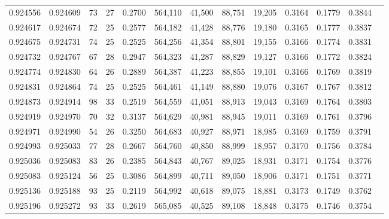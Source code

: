 \begin{tabular}{rrrrrrrrrrrrr}
0.924556 & 0.924609 &    73 &  27 &                                     0.2700 & 564,110 &  41,500 &  88,751 &  19,205 & 0.3164 & 0.1779 & 0.3844 \\
0.924617 & 0.924674 &    72 &  25 &                                     0.2577 & 564,182 &  41,428 &  88,776 &  19,180 & 0.3165 & 0.1777 & 0.3837 \\
0.924675 & 0.924731 &    74 &  25 &                                     0.2525 & 564,256 &  41,354 &  88,801 &  19,155 & 0.3166 & 0.1774 & 0.3831 \\
0.924732 & 0.924767 &    67 &  28 &                                     0.2947 & 564,323 &  41,287 &  88,829 &  19,127 & 0.3166 & 0.1772 & 0.3824 \\
0.924774 & 0.924830 &    64 &  26 &                                     0.2889 & 564,387 &  41,223 &  88,855 &  19,101 & 0.3166 & 0.1769 & 0.3819 \\
0.924831 & 0.924864 &    74 &  25 &                                     0.2525 & 564,461 &  41,149 &  88,880 &  19,076 & 0.3167 & 0.1767 & 0.3812 \\
0.924873 & 0.924914 &    98 &  33 &                                     0.2519 & 564,559 &  41,051 &  88,913 &  19,043 & 0.3169 & 0.1764 & 0.3803 \\
0.924919 & 0.924970 &    70 &  32 &                                     0.3137 & 564,629 &  40,981 &  88,945 &  19,011 & 0.3169 & 0.1761 & 0.3796 \\
0.924971 & 0.924990 &    54 &  26 &                                     0.3250 & 564,683 &  40,927 &  88,971 &  18,985 & 0.3169 & 0.1759 & 0.3791 \\
0.924993 & 0.925033 &    77 &  28 &                                     0.2667 & 564,760 &  40,850 &  88,999 &  18,957 & 0.3170 & 0.1756 & 0.3784 \\
0.925036 & 0.925083 &    83 &  26 &                                     0.2385 & 564,843 &  40,767 &  89,025 &  18,931 & 0.3171 & 0.1754 & 0.3776 \\
0.925083 & 0.925124 &    56 &  25 &                                     0.3086 & 564,899 &  40,711 &  89,050 &  18,906 & 0.3171 & 0.1751 & 0.3771 \\
0.925136 & 0.925188 &    93 &  25 &                                     0.2119 & 564,992 &  40,618 &  89,075 &  18,881 & 0.3173 & 0.1749 & 0.3762 \\
0.925196 & 0.925272 &    93 &  33 &                                     0.2619 & 565,085 &  40,525 &  89,108 &  18,848 & 0.3175 & 0.1746 & 0.3754 \\

\end{tabular}

